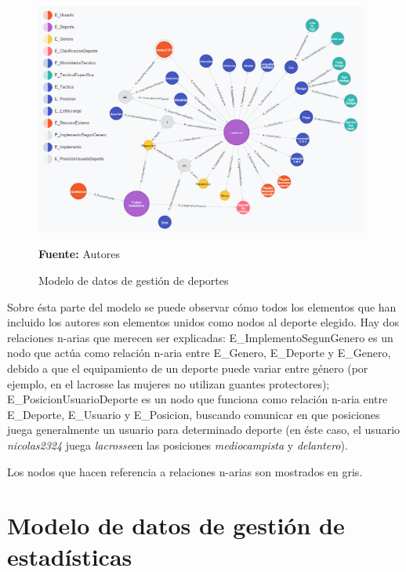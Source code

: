 \begin{figure}[!htb]
  \begin{center}
    \includegraphics[width=11cm]{./imagenes/Modelo_de_datos/Gestion_deportes.png}
    \caption{Modelo de datos de gestión de deportes}
    \label{fig:modelo_datos_gestion_deportes}
    \textbf{Fuente:}  Autores
  \end{center}
\end{figure}

Sobre ésta parte del modelo se puede observar cómo todos los elementos que han incluido los autores son elementos unidos como nodos al deporte elegido. Hay dos relaciones n-arias que merecen ser explicadas: E\_ImplementoSegunGenero es un nodo que actúa como relación n-aria entre E\_Genero, E\_Deporte y E\_Genero, debido a que el equipamiento de un deporte puede variar entre género (por ejemplo, en el lacrosse las mujeres no utilizan guantes protectores); E\_PosicionUsuarioDeporte es un nodo que funciona como relación n-aria entre E\_Deporte, E\_Usuario y E\_Posicion, buscando comunicar en que posiciones juega generalmente un usuario para determinado deporte (en éste caso, el usuario \textit{nicolas2324} juega \textit{lacrosse}en las posiciones \textit{mediocampista} y \textit{delantero}).

Los nodos que hacen referencia a relaciones n-arias son mostrados en gris.

\section{Modelo de datos de gestión de estadísticas}

